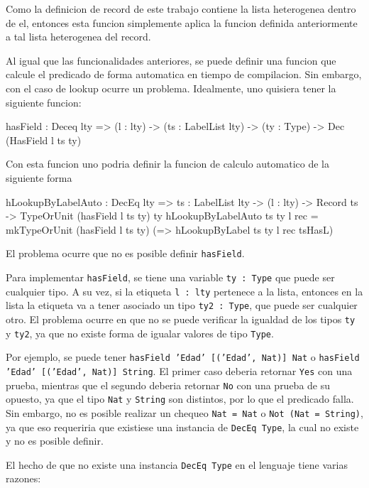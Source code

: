 Como la definicion de record de este trabajo contiene la lista heterogenea dentro de el, entonces esta funcion simplemente aplica la funcion definida anteriormente a tal lista heterogenea del record.

Al igual que las funcionalidades anteriores, se puede definir una funcion que calcule el predicado de forma automatica en tiempo de compilacion. Sin embargo, con el caso de lookup ocurre un problema. Idealmente, uno quisiera tener la siguiente funcion:

\begin{code}
hasField : Deceq lty => (l : lty) -> 
  (ts : LabelList lty) -> (ty : Type) -> 
  Dec (HasField l ts ty)
\end{code}

Con esta funcion uno podria definir la funcion de calculo automatico de la siguiente forma

\begin{code}
hLookupByLabelAuto : DecEq lty => {ts : LabelList lty} ->
  (l : lty) -> Record ts -> 
  TypeOrUnit (hasField l ts ty) ty
hLookupByLabelAuto {ts} {ty} l rec = 
  mkTypeOrUnit (hasField l ts ty) 
  (\tsHasL => hLookupByLabel {ts} {ty} l rec tsHasL)
\end{code}

El problema ocurre que no es posible definir \texttt{hasField}.

Para implementar \texttt{hasField}, se tiene una variable \texttt{ty : Type} que puede ser cualquier tipo. A su vez, si la etiqueta \texttt{l : lty} pertenece a la lista, entonces en la lista la etiqueta va a tener asociado un tipo \texttt{ty2 : Type}, que puede ser cualquier otro. El problema ocurre en que no se puede verificar la igualdad de los tipos \texttt{ty} y \texttt{ty2}, ya que no existe forma de igualar valores de tipo \texttt{Type}.

Por ejemplo, se puede tener \texttt{hasField 'Edad' [('Edad', Nat)] Nat} o \texttt{hasField 'Edad' [('Edad', Nat)] String}. El primer caso deberia retornar \texttt{Yes} con una prueba, mientras que el segundo deberia retornar \texttt{No} con una prueba de su opuesto, ya que el tipo \texttt{Nat} y \texttt{String} son distintos, por lo que el predicado falla. Sin embargo, no es posible realizar un chequeo \texttt{Nat = Nat} o \texttt{Not (Nat = String)}, ya que eso requeriria que existiese una instancia de \texttt{DecEq Type}, la cual no existe y no es posible definir.

El hecho de que no existe una instancia \texttt{DecEq Type} en el lenguaje tiene varias razones:

